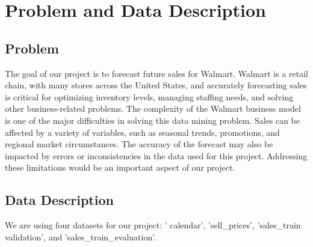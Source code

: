 \documentclass[fleqn,10pt]{SelfArx} %
\affiliation{\textsuperscript{1}\textit{Luddy School of Informatics, Computing, and Engineering, Indiana University, Bloomington, IN, USA}} %
\begin{document}
\flushbottom %

\maketitle %

\tableofcontents %

\thispagestyle{empty} %






\section{Problem and Data Description} %
\subsection{Problem}
The goal of our project is to forecast future sales for Walmart. Walmart is a retail chain, with
many stores across the United States, and accurately forecasting sales is critical for optimizing
inventory levels, managing staffing needs, and solving other business-related problems. The complexity of the Walmart business model is one of the major difficulties in solving this data mining
problem. Sales can be affected by a variety of variables, such as seasonal trends, promotions,
and regional market circumstances. The accuracy of the forecast may also be impacted by errors
or inconsistencies in the data used for this project. Addressing these limitations would be an
important aspect of our project.

\subsection{Data Description}
We are using four datasets for our project: ' calendar', 'sell\_prices', 'sales\_train validation', and 'sales\_train\_evaluation'.
\end{document}
